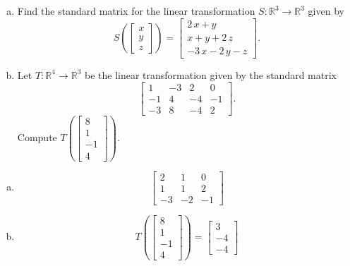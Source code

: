 
\begin{exerciseStatement}

\begin{enumerate}[(a)]
\item Find the standard matrix for the linear transformation \(S:\mathbb{R}^ 3  \to \mathbb{R}^ 3 \) given by \[S\left(  \left[\begin{array}{c}
x \\
y \\
z
\end{array}\right]  \right) =  \left[\begin{array}{c}
2 \, x + y \\
x + y + 2 \, z \\
-3 \, x - 2 \, y - z
\end{array}\right] .\]
\item Let \(T:\mathbb{R}^ 4  \to \mathbb{R}^ 3 \) be the linear transformation given by the standard matrix \[ \left[\begin{array}{cccc}
1 & -3 & 2 & 0 \\
-1 & 4 & -4 & -1 \\
-3 & 8 & -4 & 2
\end{array}\right] .\] Compute \(T\left( \left[\begin{array}{c}
8 \\
1 \\
-1 \\
4
\end{array}\right]  \right)\). 
\end{enumerate}
    
\end{exerciseStatement}
    
\begin{exerciseAnswer} 

\begin{enumerate}[(a)]
\item \[ \left[\begin{array}{ccc}
2 & 1 & 0 \\
1 & 1 & 2 \\
-3 & -2 & -1
\end{array}\right] \]
\item \[T\left( \left[\begin{array}{c}
8 \\
1 \\
-1 \\
4
\end{array}\right]  \right)= \left[\begin{array}{c}
3 \\
-4 \\
-4
\end{array}\right] \]
\end{enumerate}
    
\end{exerciseAnswer}
    
